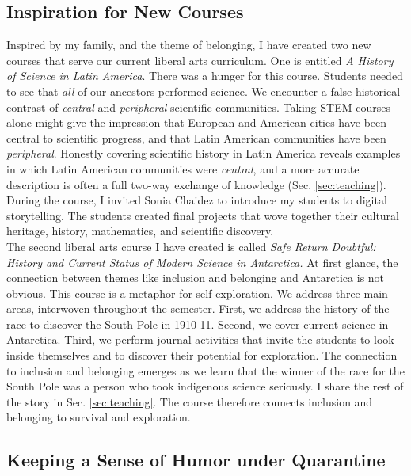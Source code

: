 \documentclass[../../main.tex]{subfiles}
\begin{document}
\subsection{Inspiration for New Courses}

Inspired by my family, and the theme of belonging, I have created two new courses that serve our current liberal arts curriculum.  One is entitled \textit{A History of Science in Latin America}.  There was a hunger for this course.  Students needed to see that \textit{all} of our ancestors performed science.  We encounter a false historical contrast of \textit{central} and \textit{peripheral} scientific communities.  Taking STEM courses alone might give the impression that European and American cities have been central to scientific progress, and that Latin American communities have been \textit{peripheral}.  Honestly covering scientific history in Latin America reveals examples in which Latin American communities were \textit{central}, and a more accurate description is often a full two-way exchange of knowledge (Sec. \ref{sec:teaching}).  During the course, I invited Sonia Chaidez to introduce my students to digital storytelling.  The students created final projects that wove together their cultural heritage, history, mathematics, and scientific discovery.
\\
\vspace{0.15cm}
The second liberal arts course I have created is called \textit{Safe Return Doubtful: History and Current Status of Modern Science in Antarctica.}  At first glance, the connection between themes like inclusion and belonging and Antarctica is not obvious.  This course is a metaphor for self-exploration.  We address three main areas, interwoven throughout the semester.  First, we address the history of the race to discover the South Pole in 1910-11.  Second, we cover current science in Antarctica.  Third, we perform journal activities that invite the students to look inside themselves and to discover their potential for exploration.  The connection to inclusion and belonging emerges as we learn that the winner of the race for the South Pole was a person who took indigenous science seriously.  I share the rest of the story in Sec. \ref{sec:teaching}.  The course therefore connects inclusion and belonging to survival and exploration.

\subsection{Keeping a Sense of Humor under Quarantine}
\end{document}
